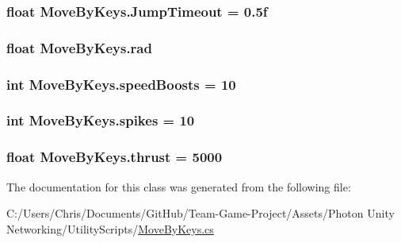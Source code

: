 \subsubsection[{\texorpdfstring{Jump\+Timeout}{JumpTimeout}}]{\setlength{\rightskip}{0pt plus 5cm}float Move\+By\+Keys.\+Jump\+Timeout = 0.\+5f}\hypertarget{class_move_by_keys_a78f351dfc4cfdf17213df54dee9ba73f}{}\label{class_move_by_keys_a78f351dfc4cfdf17213df54dee9ba73f}
\subsubsection[{\texorpdfstring{rad}{rad}}]{\setlength{\rightskip}{0pt plus 5cm}float Move\+By\+Keys.\+rad}\hypertarget{class_move_by_keys_ab257d4fc7ebb9aa457bb19c85dc7874d}{}\label{class_move_by_keys_ab257d4fc7ebb9aa457bb19c85dc7874d}
\subsubsection[{\texorpdfstring{speed\+Boosts}{speedBoosts}}]{\setlength{\rightskip}{0pt plus 5cm}int Move\+By\+Keys.\+speed\+Boosts = 10}\hypertarget{class_move_by_keys_abe7c462b0359cd7923ee81166dcbce50}{}\label{class_move_by_keys_abe7c462b0359cd7923ee81166dcbce50}
\subsubsection[{\texorpdfstring{spikes}{spikes}}]{\setlength{\rightskip}{0pt plus 5cm}int Move\+By\+Keys.\+spikes = 10}\hypertarget{class_move_by_keys_a69b4ceaaa671fa3a62ee1281b7c755b7}{}\label{class_move_by_keys_a69b4ceaaa671fa3a62ee1281b7c755b7}
\subsubsection[{\texorpdfstring{thrust}{thrust}}]{\setlength{\rightskip}{0pt plus 5cm}float Move\+By\+Keys.\+thrust = 5000}\hypertarget{class_move_by_keys_a5702f7b18a522ed877f1c1683e3acd6e}{}\label{class_move_by_keys_a5702f7b18a522ed877f1c1683e3acd6e}


The documentation for this class was generated from the following file\+:\begin{DoxyCompactItemize}
\item 
C\+:/\+Users/\+Chris/\+Documents/\+Git\+Hub/\+Team-\/\+Game-\/\+Project/\+Assets/\+Photon Unity Networking/\+Utility\+Scripts/\hyperlink{_move_by_keys_8cs}{Move\+By\+Keys.\+cs}\end{DoxyCompactItemize}
